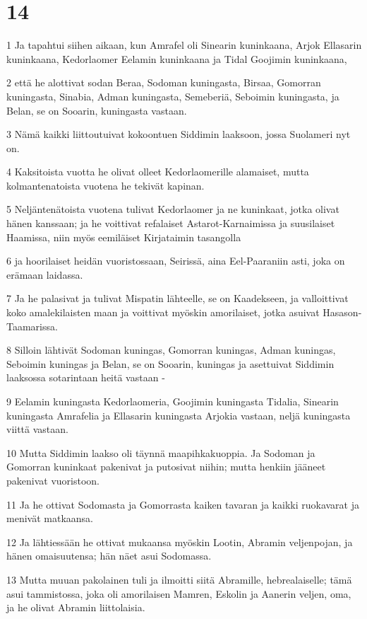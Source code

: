 \chapter{14}

\par 1 Ja tapahtui siihen aikaan, kun Amrafel oli Sinearin kuninkaana, Arjok Ellasarin kuninkaana, Kedorlaomer Eelamin kuninkaana ja Tidal Goojimin kuninkaana,
\par 2 että he alottivat sodan Beraa, Sodoman kuningasta, Birsaa, Gomorran kuningasta, Sinabia, Adman kuningasta, Semeberiä, Seboimin kuningasta, ja Belan, se on Sooarin, kuningasta vastaan.
\par 3 Nämä kaikki liittoutuivat kokoontuen Siddimin laaksoon, jossa Suolameri nyt on.
\par 4 Kaksitoista vuotta he olivat olleet Kedorlaomerille alamaiset, mutta kolmantenatoista vuotena he tekivät kapinan.
\par 5 Neljäntenätoista vuotena tulivat Kedorlaomer ja ne kuninkaat, jotka olivat hänen kanssaan; ja he voittivat refalaiset Astarot-Karnaimissa ja suusilaiset Haamissa, niin myös eemiläiset Kirjataimin tasangolla
\par 6 ja hoorilaiset heidän vuoristossaan, Seirissä, aina Eel-Paaraniin asti, joka on erämaan laidassa.
\par 7 Ja he palasivat ja tulivat Mispatin lähteelle, se on Kaadekseen, ja valloittivat koko amalekilaisten maan ja voittivat myöskin amorilaiset, jotka asuivat Hasason-Taamarissa.
\par 8 Silloin lähtivät Sodoman kuningas, Gomorran kuningas, Adman kuningas, Seboimin kuningas ja Belan, se on Sooarin, kuningas ja asettuivat Siddimin laaksossa sotarintaan heitä vastaan -
\par 9 Eelamin kuningasta Kedorlaomeria, Goojimin kuningasta Tidalia, Sinearin kuningasta Amrafelia ja Ellasarin kuningasta Arjokia vastaan, neljä kuningasta viittä vastaan.
\par 10 Mutta Siddimin laakso oli täynnä maapihkakuoppia. Ja Sodoman ja Gomorran kuninkaat pakenivat ja putosivat niihin; mutta henkiin jääneet pakenivat vuoristoon.
\par 11 Ja he ottivat Sodomasta ja Gomorrasta kaiken tavaran ja kaikki ruokavarat ja menivät matkaansa.
\par 12 Ja lähtiessään he ottivat mukaansa myöskin Lootin, Abramin veljenpojan, ja hänen omaisuutensa; hän näet asui Sodomassa.
\par 13 Mutta muuan pakolainen tuli ja ilmoitti siitä Abramille, hebrealaiselle; tämä asui tammistossa, joka oli amorilaisen Mamren, Eskolin ja Aanerin veljen, oma, ja he olivat Abramin liittolaisia.
